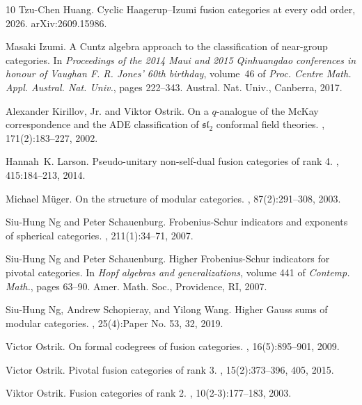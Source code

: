 \documentclass[10pt]{article}
\theoremstyle{plain}
\theoremstyle{definition}
\theoremstyle{plain}
\begin{document}
\begin{thebibliography}{10}
Tzu-Chen Huang.
\newblock Cyclic {H}aagerup--{I}zumi fusion categories at every odd order,
  2026.
\newblock arXiv:2609.15986.

Masaki Izumi.
\newblock A {C}untz algebra approach to the classification of near-group
  categories.
\newblock In {\em Proceedings of the 2014 {M}aui and 2015 {Q}inhuangdao
  conferences in honour of {V}aughan {F}. {R}. {J}ones' 60th birthday},
  volume~46 of {\em Proc. Centre Math. Appl. Austral. Nat. Univ.}, pages
  222--343. Austral. Nat. Univ., Canberra, 2017.

Alexander Kirillov, Jr. and Viktor Ostrik.
\newblock On a {$q$}-analogue of the {M}c{K}ay correspondence and the {ADE}
  classification of {$\mathfrak{sl}_2$} conformal field theories.
, 171(2):183--227, 2002.

Hannah~K. Larson.
\newblock Pseudo-unitary non-self-dual fusion categories of rank 4.
, 415:184--213, 2014.

Michael M\"{u}ger.
\newblock On the structure of modular categories.
, 87(2):291--308, 2003.

Siu-Hung Ng and Peter Schauenburg.
\newblock Frobenius-{S}chur indicators and exponents of spherical categories.
, 211(1):34--71, 2007.

Siu-Hung Ng and Peter Schauenburg.
\newblock Higher {F}robenius-{S}chur indicators for pivotal categories.
\newblock In {\em Hopf algebras and generalizations}, volume 441 of {\em
  Contemp. Math.}, pages 63--90. Amer. Math. Soc., Providence, RI, 2007.

Siu-Hung Ng, Andrew Schopieray, and Yilong Wang.
\newblock Higher {G}auss sums of modular categories.
, 25(4):Paper No. 53, 32, 2019.

Victor Ostrik.
\newblock On formal codegrees of fusion categories.
, 16(5):895--901, 2009.

Victor Ostrik.
\newblock Pivotal fusion categories of rank 3.
, 15(2):373--396, 405, 2015.

Viktor Ostrik.
\newblock Fusion categories of rank 2.
, 10(2-3):177--183, 2003.


\end{thebibliography}
\end{document}
